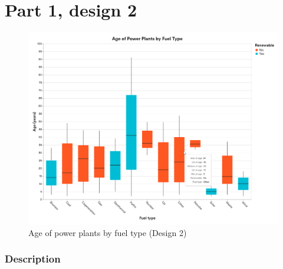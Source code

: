 \hypertarget{part-1-design-2}{
\section{Part 1, design 2}\label{part-1-design-2}}

\begin{figure}[ht]
  \centering
  \includegraphics[width=\textwidth]{../img/design2}
  \caption{Age of power plants by fuel type (Design 2)}
\end{figure}

\hypertarget{description}{
\subsubsection{Description}\label{description}}

